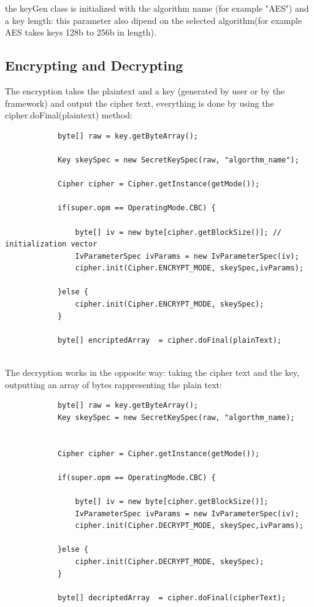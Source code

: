 \documentclass{article}
\begin{document}
		the keyGen class is initialized with the algorithm name (for example "AES") and a key length: this parameter also dipend on the selected algorithm(for example AES takes keys 128b to 256b in length).
		
		\subsection{Encrypting and Decrypting}
		
		The encryption takes the plaintext and a key (generated by user or by the framework) and output the cipher text, everything is done by using the cipher.doFinal(plaintext) method:
		
		\begin{verbatim}
			byte[] raw = key.getByteArray();
			
			Key skeySpec = new SecretKeySpec(raw, "algorthm_name");			
			
			Cipher cipher = Cipher.getInstance(getMode());

			if(super.opm == OperatingMode.CBC) {

				byte[] iv = new byte[cipher.getBlockSize()]; // initialization vector
				IvParameterSpec ivParams = new IvParameterSpec(iv);
				cipher.init(Cipher.ENCRYPT_MODE, skeySpec,ivParams);

			}else {
				cipher.init(Cipher.ENCRYPT_MODE, skeySpec);
			}

			byte[] encriptedArray  = cipher.doFinal(plainText);
			
		\end{verbatim}
		
		The decryption works in the opposite way: taking the cipher text and the key, outputting an array of bytes rappresenting the plain text:
		
			\begin{verbatim}
			byte[] raw = key.getByteArray();
			Key skeySpec = new SecretKeySpec(raw, "algorthm_name);
			
			
			Cipher cipher = Cipher.getInstance(getMode());

			if(super.opm == OperatingMode.CBC) {

				byte[] iv = new byte[cipher.getBlockSize()];
				IvParameterSpec ivParams = new IvParameterSpec(iv);
				cipher.init(Cipher.DECRYPT_MODE, skeySpec,ivParams);

			}else {
				cipher.init(Cipher.DECRYPT_MODE, skeySpec);
			}

			byte[] decriptedArray  = cipher.doFinal(cipherText);
			
		\end{verbatim}
		
\end{document}
